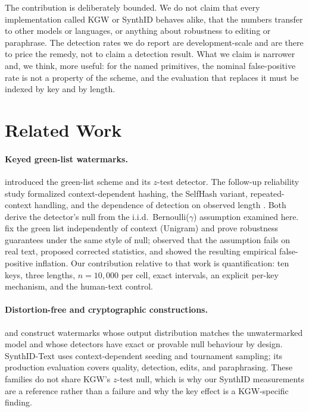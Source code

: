 \documentclass[conference]{IEEEtran}
\begin{document}
The contribution is deliberately bounded. We do not claim that every
implementation called KGW or SynthID behaves alike, that the numbers transfer to
other models or languages, or anything about robustness to editing or
paraphrase. The detection rates we do report are development-scale and are there
to price the remedy, not to claim a detection result. What we claim is narrower and, we think, more
useful: for the named primitives, the nominal false-positive rate is not a
property of the scheme, and the evaluation that replaces it must be indexed by
key and by length.

\section{Related Work}

\paragraph{Keyed green-list watermarks.}
\citet{kirchenbauer2023watermark} introduced the green-list scheme and its
$z$-test detector. The follow-up reliability study formalized context-dependent
hashing, the SelfHash variant, repeated-context handling, and the dependence of
detection on observed length \citep{kirchenbauer2024reliability}. Both derive the
detector's null from the i.i.d.\ Bernoulli($\gamma$) assumption examined here.
\citet{zhao2023unigram} fix the green list independently of context (Unigram) and
prove robustness guarantees under the same style of null; \citet{fernandez2023bricks}
observed that the assumption fails on real text, proposed corrected statistics,
and showed the resulting empirical false-positive inflation. Our contribution
relative to that work is quantification: ten keys, three lengths, $n=10{,}000$ per
cell, exact intervals, an explicit per-key mechanism, and the human-text control.

\paragraph{Distortion-free and cryptographic constructions.}
\citet{kuditipudi2023robust} and \citet{christ2023undetectable} construct
watermarks whose output distribution matches the unwatermarked model and whose
detectors have exact or provable null behaviour by design. SynthID-Text
\citep{dathathri2024synthid} uses context-dependent seeding and tournament
sampling; its production evaluation covers quality, detection, edits, and
paraphrasing. These families do not share KGW's $z$-test null, which is why our
SynthID measurements are a reference rather than a failure and why the key effect
is a KGW-specific finding.
\end{document}
